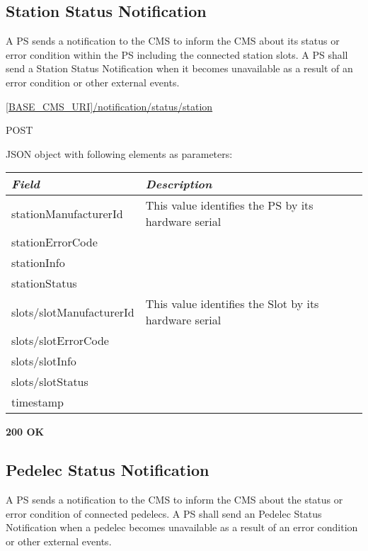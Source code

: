 
\subsection{Station Status Notification}

A \acs{PS} sends a notification to the \acs{CMS} to inform the \acs{CMS} about its status or error condition within the \acs{PS} including the connected station slots. A \acs{PS} shall send a Station Status Notification when it becomes unavailable as a result of an error condition or other external events.

 \url{[BASE_CMS_URI]/notification/status/station}

 POST

JSON object with following elements as parameters:\\
\begin{tabularx}{\linewidth}{ | l | X | }
  \hline
  \textit{Field} & \textit{Description} \\
  \hline \hline
  stationManufacturerId 		& This value identifies the PS by its hardware serial\\
  stationErrorCode & \\
  stationInfo & \\
  stationStatus & \\
  slots/slotManufacturerId 	& This value identifies the Slot by its hardware serial \\
  slots/slotErrorCode & \\
  slots/slotInfo & \\
  slots/slotStatus & \\
  timestamp & \\
  
    \hline
\end{tabularx}

\textbf{200 OK}\\


\subsection{Pedelec Status Notification}

A \acs{PS} sends a notification to the \acs{CMS} to inform the \acs{CMS} about the status or error condition of connected pedelecs. A \acs{PS} shall send an Pedelec Status Notification when a pedelec becomes unavailable as a result of an error condition or other external events.

